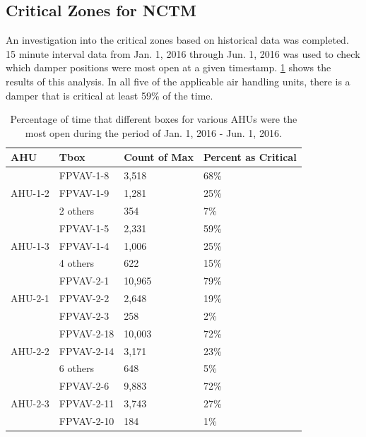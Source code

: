 \subsection{Critical Zones for NCTM}

An investigation into the critical zones based on historical data was completed. 15 minute interval data from Jan. 1, 2016 through Jun. 1, 2016 was used to check which damper positions were most open at a given timestamp. \tableref{} \ref{tab:AHU12CriticalZone} shows the results of this analysis. In all five of the applicable air handling units, there is a damper that is critical at least 59\% of the time. 

\begin{table}
\centering
\caption{Percentage of time that different boxes for various AHUs were the most open during the period of Jan. 1, 2016 - Jun. 1, 2016.}
\label{tab:AHU12CriticalZone}
\begin{tabular}{@{}llll@{}}
\toprule
AHU                       &  Tbox       & Count of Max & Percent as Critical \\ \midrule
\multirow{3}{*}{AHU-1-2}  &  FPVAV-1-8  & 3,518        & 68\%                \\
                          &  FPVAV-1-9  & 1,281        & 25\%                \\
                          &  2 others   & 354          & 7\%                 \\ \midrule
\multirow{3}{*}{AHU-1-3} & FPVAV-1-5 & 2,331        & 59\%                \\
                         & FPVAV-1-4 & 1,006        & 25\%                \\
                         & 4 others  & 622          & 15\%                 \\ \midrule
\multirow{3}{*}{AHU-2-1} &  FPVAV-2-1   &   10,965   &    79\%  \\
                         &  FPVAV-2-2   &   2,648   &    19\%  \\
                         &  FPVAV-2-3   &   258   &    2\% \\ \midrule
\multirow{3}{*}{AHU-2-2} &    FPVAV-2-18   &   	10,003	&  72\%  \\
&  FPVAV-2-14   &    	3,171   &  	23\%  \\
&  6 others   &   	648	&  5\%  \\ \midrule
\multirow{3}{*}{AHU-2-3}  & FPVAV-2-6   &   9,883     &   72\%  \\ 
                        & FPVAV-2-11     &   3,743     &   27\%  \\ 
                        & FPVAV-2-10     &   184     &   1\%  \\ \midrule
\end{tabular}
\end{table}



